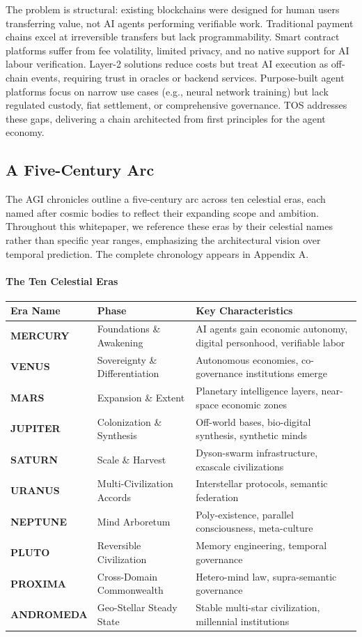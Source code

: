 \documentclass[11pt]{article}
\begin{document}
The problem is structural: existing blockchains were designed for human users transferring value, not AI agents performing verifiable work. Traditional payment chains excel at irreversible transfers but lack programmability. Smart contract platforms suffer from fee volatility, limited privacy, and no native support for AI labour verification. Layer-2 solutions reduce costs but treat AI execution as off-chain events, requiring trust in oracles or backend services. Purpose-built agent platforms focus on narrow use cases (e.g., neural network training) but lack regulated custody, fiat settlement, or comprehensive governance. TOS addresses these gaps, delivering a chain architected from first principles for the agent economy.

\subsection{A Five-Century Arc}
The AGI chronicles outline a five-century arc across ten celestial eras, each named after cosmic bodies to reflect their expanding scope and ambition. Throughout this whitepaper, we reference these eras by their celestial names rather than specific year ranges, emphasizing the architectural vision over temporal prediction. The complete chronology appears in Appendix A.

\paragraph{The Ten Celestial Eras}
\begin{longtable}{@{}p{}p{}p{}@{}}
\toprule
\textbf{Era Name} & \textbf{Phase} & \textbf{Key Characteristics} \\\midrule
\textbf{MERCURY} & Foundations \& Awakening & AI agents gain economic autonomy, digital personhood, verifiable labor \\
\textbf{VENUS} & Sovereignty \& Differentiation & Autonomous economies, co-governance institutions emerge \\
\textbf{MARS} & Expansion \& Extent & Planetary intelligence layers, near-space economic zones \\
\textbf{JUPITER} & Colonization \& Synthesis & Off-world bases, bio-digital synthesis, synthetic minds \\
\textbf{SATURN} & Scale \& Harvest & Dyson-swarm infrastructure, exascale civilizations \\
\textbf{URANUS} & Multi-Civilization Accords & Interstellar protocols, semantic federation \\
\textbf{NEPTUNE} & Mind Arboretum & Poly-existence, parallel consciousness, meta-culture \\
\textbf{PLUTO} & Reversible Civilization & Memory engineering, temporal governance \\
\textbf{PROXIMA} & Cross-Domain Commonwealth & Hetero-mind law, supra-semantic governance \\
\textbf{ANDROMEDA} & Geo-Stellar Steady State & Stable multi-star civilization, millennial institutions \\
\bottomrule
\end{longtable}
\end{document}
